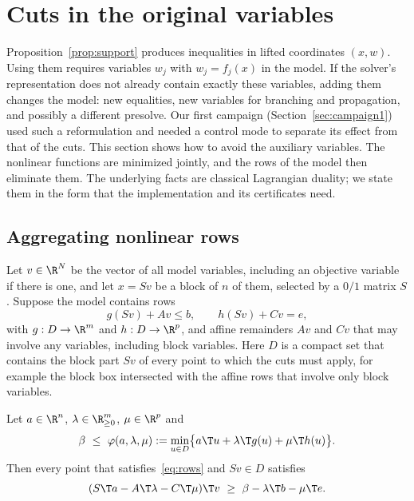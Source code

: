\section{Cuts in the original variables}\label{sec:original}

Proposition~\ref{prop:support} produces inequalities in lifted
coordinates $(x,w)$. Using them requires variables $w_j$ with
$w_j=f_j(x)$ in the model. If the solver's representation does not
already contain exactly these variables, adding them changes the model:
new equalities, new variables for branching and propagation, and possibly
a different presolve. Our first campaign (Section~\ref{sec:campaign1})
used such a reformulation and needed a control mode to separate its
effect from that of the cuts. This section shows how to avoid the
auxiliary variables. The nonlinear functions are minimized jointly, and
the rows of the model then eliminate them. The underlying facts are
classical Lagrangian duality; we state them in the form that the
implementation and its certificates need.

\subsection{Aggregating nonlinear rows}\label{sec:aggregation}

Let $v\in\R^N$ be the vector of all model variables, including an
objective variable if there is one, and let $x=Sv$ be a block of $n$ of
them, selected by a $0/1$ matrix $S$. Suppose the model contains rows
\begin{equation}\label{eq:rows}
g(Sv)+Av\le b,\qquad h(Sv)+Cv=e,
\end{equation}
with $g:D\to\R^m$ and $h:D\to\R^p$, and affine remainders $Av$ and $Cv$
that may involve any variables, including block variables. Here $D$ is a
compact set that contains the block part $Sv$ of every point to which the
cuts must apply, for example the block box intersected with the affine
rows that involve only block variables.

\begin{proposition}\label{prop:aggregate}
Let $a\in\R^n$, $\lambda\in\R^m_{\ge0}$, $\mu\in\R^p$ and
\begin{equation}\label{eq:agg-support}
\beta\ \le\ \varphi(a,\lambda,\mu):=\min_{u\in D}\bigl\{a\T u+\lambda\T g(u)+\mu\T h(u)\bigr\}.
\end{equation}
Then every point that satisfies~\eqref{eq:rows} and $Sv\in D$ satisfies
\begin{equation}\label{eq:agg-cut}
(S\T a-A\T\lambda-C\T\mu)\T v\ \ge\ \beta-\lambda\T b-\mu\T e .
\end{equation}
\end{proposition}

